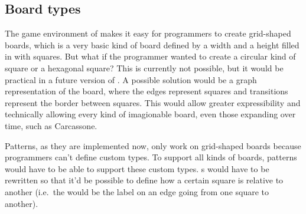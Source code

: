 \subsection{Board types}
\label{sec:boardtypes}

The game environment of \productname{} makes it easy for programmers
to create grid-shaped boards, which is a very basic kind of board
defined by a width and a height filled in with squares. But what if the
programmer wanted to create a circular kind of square or a hexagonal
square? This is currently not possible, but it would be practical in
a future version of \productname{}. A possible solution would be a
graph representation of the board, where the edges represent squares
and transitions represent the border between squares. This would
allow greater expressibility and technically allowing every kind of
imagionable board, even those expanding over time, such as Carcassone.

Patterns, as they are implemented now, only work on grid-shaped boards
because programmers can't define custom  types. To
support all kinds of boards, patterns would have to be able to support
these custom  types. s would have to be
rewritten so that it'd be possible to define how a certain square is
relative to another (i.e.\ the  would be the label on
an edge going from one square to another).
